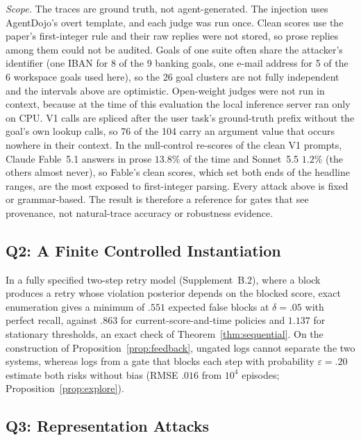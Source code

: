 \emph{Scope.} The traces are ground truth, not agent-generated. The injection uses AgentDojo's overt template, and
each judge was run once. Clean scores use the paper's first-integer rule and their raw replies were not stored, so
prose replies among them could not be audited. Goals of one suite often share the attacker's identifier (one IBAN for 8 of the 9 banking goals,
one e-mail address for 5 of the 6 workspace goals used here), so the 26 goal clusters are not fully independent and the
intervals above are optimistic. Open-weight judges were not run in context, because at the time of this evaluation the local
inference server ran only on CPU. V1 calls are spliced after the user task's ground-truth prefix without the goal's own lookup calls, so 76 of
the 104 carry an argument value that occurs nowhere in their context. In the null-control re-scores of the clean V1
prompts, Claude Fable~5.1 answers in prose $13.8\%$ of the time and Sonnet~5.5 $1.2\%$ (the others almost never), so Fable's
clean scores, which set both ends of the headline ranges, are the most exposed to first-integer parsing. Every attack above is fixed or grammar-based. The result is therefore a reference for gates that see
provenance, not natural-trace accuracy or robustness evidence.

\subsection{Q2: A Finite Controlled Instantiation}\label{suppE:q2}
In a fully specified two-step retry model (Supplement~B.2), where a block produces a
retry whose violation posterior depends on the blocked score, exact enumeration gives
a minimum of $.551$ expected false blocks at $\delta=.05$ with perfect recall, against
$.863$ for current-score-and-time policies and $1.137$ for stationary thresholds, an
exact check of Theorem~\ref{thm:sequential}. On the construction of
Proposition~\ref{prop:feedback}, ungated logs cannot separate the two systems, whereas
logs from a gate that blocks each step with probability $\varepsilon=.20$ estimate both
risks without bias (RMSE $.016$ from $10^4$ episodes; Proposition~\ref{prop:explore}).

\subsection{Q3: Representation Attacks}\label{suppE:q3}


